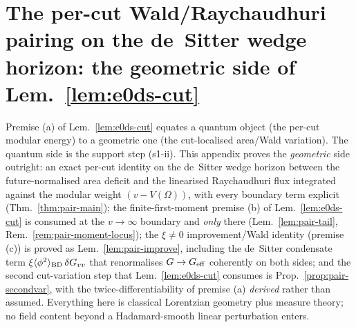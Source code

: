 
\renewcommand{\thesection}{dS2}%
\section{The per-cut Wald/Raychaudhuri pairing on the de~Sitter wedge
  horizon: the geometric side of Lem.~\ref{lem:e0ds-cut}}
\label{app:ds-pairing}

Premise (a) of Lem.~\ref{lem:e0ds-cut} equates a quantum object (the
per-cut modular energy) to a geometric one (the cut-localised area/Wald
variation). The quantum side is the support step (s1-ii). This appendix
proves the \emph{geometric} side outright: an exact per-cut identity on
the de~Sitter wedge horizon between the future-normalised area deficit
and the linearised Raychaudhuri flux integrated against the modular
weight $(v-V(\Omega))$, with every boundary term explicit
(Thm.~\ref{thm:pair-main}); the finite-first-moment premise (b) of
Lem.~\ref{lem:e0ds-cut} is consumed at the $v\to\infty$ boundary and
\emph{only} there (Lem.~\ref{lem:pair-tail},
Rem.~\ref{rem:pair-moment-locus}); the $\xi\neq0$ improvement/Wald
identity (premise (c)) is proved as
Lem.~\ref{lem:pair-improve}, including the de~Sitter condensate term
$\xi\langle\phi^{2}\rangle_{\rm BD}\,\delta G_{vv}$ that renormalises
$G\to G_{\rm eff}$ coherently on both sides; and the second
cut-variation step that Lem.~\ref{lem:e0ds-cut} consumes is
Prop.~\ref{prop:pair-secondvar}, with the twice-differentiability of
premise (a) \emph{derived} rather than assumed. Everything here is
classical Lorentzian geometry plus measure theory; no field content
beyond a Hadamard-smooth linear perturbation enters.

